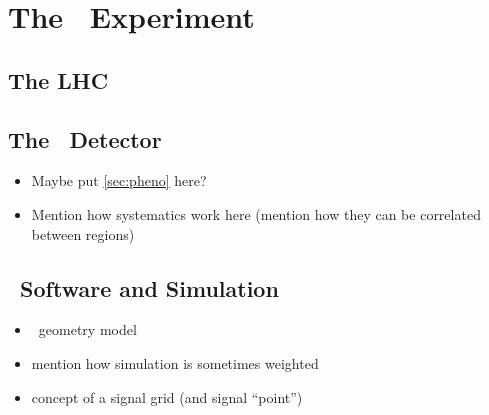 \chapter{The \atlas\ Experiment}
\section{The LHC}
\section{The \atlas\ Detector}
\begin{itemize}
\item Maybe put \cref{sec:pheno} here?
\item Mention how systematics work here (mention how they can be correlated between regions)
\end{itemize}
\section{\atlas\ Software and Simulation}
\begin{itemize}
\item \atlas\ geometry model
\item mention how simulation is sometimes weighted
\item concept of a signal grid (and signal ``point'')
\end{itemize}

